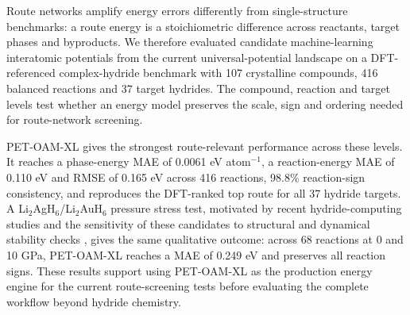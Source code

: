 \documentclass[11pt, letterpaper]{article}
\begin{document}
Route networks amplify energy errors differently from single-structure benchmarks: a route energy is a stoichiometric difference across reactants, target phases and byproducts. We therefore evaluated candidate machine-learning interatomic potentials from the current universal-potential landscape \cite{chen2022m3gnet,deng2023chgnet,batatia2022mace,park2024sevennet,yang2024mattersim,pozdnyakov2023pet,mazitov2025petmad,bigi2026upet} on a DFT-referenced complex-hydride benchmark with 107 crystalline compounds, 416 balanced reactions and 37 target hydrides. The compound, reaction and target levels test whether an energy model preserves the scale, sign and ordering needed for route-network screening.

PET-OAM-XL gives the strongest route-relevant performance across these levels. It reaches a phase-energy MAE of 0.0061 eV atom$^{-1}$, a reaction-energy MAE of 0.110 eV and RMSE of 0.165 eV across 416 reactions, 98.8\% reaction-sign consistency, and reproduces the DFT-ranked top route for all 37 hydride targets. A Li$_2$AgH$_6$/Li$_2$AuH$_6$ pressure stress test, motivated by recent hydride-computing studies and the sensitivity of these candidates to structural and dynamical stability checks \cite{ouyang2025li2auh6,gao2025maximum_tc,wei2026li2auh6_pressure,ding2026kinetic_instability}, gives the same qualitative outcome: across 68 reactions at 0 and 10 GPa, PET-OAM-XL reaches a MAE of 0.249 eV and preserves all reaction signs. These results support using PET-OAM-XL as the production energy engine for the current route-screening tests before evaluating the complete workflow beyond hydride chemistry.
\end{document}
